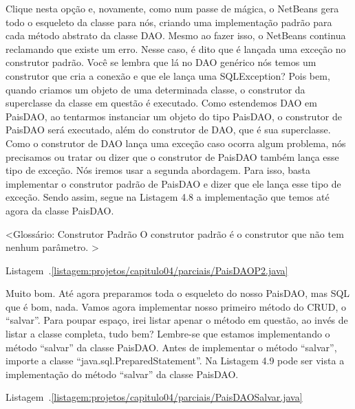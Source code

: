 Clique nesta opção e, novamente, como num passe de mágica, o NetBeans gera todo o esqueleto da classe para nós, criando uma implementação padrão para cada método abstrato da classe DAO. Mesmo ao fazer isso, o NetBeans continua reclamando que existe um erro. Nesse caso, é dito que é lançada uma exceção no construtor padrão. Você se lembra que lá no DAO genérico nós temos um construtor que cria a conexão e que ele lança uma SQLException? Pois bem, quando criamos um objeto de uma determinada classe, o construtor da superclasse da classe em questão é executado. Como estendemos DAO em PaisDAO, ao tentarmos instanciar um objeto do tipo PaisDAO, o construtor de PaisDAO será executado, além do construtor de DAO, que é sua superclasse. Como o construtor de DAO lança uma exceção caso ocorra algum problema, nós precisamos ou tratar ou dizer que o construtor de PaisDAO também lança esse tipo de exceção. Nós iremos usar a segunda abordagem. Para isso, basta implementar o construtor padrão de PaisDAO e dizer que ele lança esse tipo de exceção. Sendo assim, segue na Listagem 4.8 a implementação que temos até agora da classe PaisDAO.

<Glossário: Construtor Padrão
O construtor padrão é o construtor que não tem nenhum parâmetro.
>

Listagem~\thechapter.\ref{listagem:projetos/capitulo04/parciais/PaisDAOP2.java}

Muito bom. Até agora preparamos toda o esqueleto do nosso PaisDAO, mas SQL que é bom, nada. Vamos agora implementar nosso primeiro método do CRUD, o ``salvar''. Para poupar espaço, irei listar apenar o método em questão, ao invés de listar a classe completa, tudo bem? Lembre-se que estamos implementando o método ``salvar'' da classe PaisDAO. Antes de implementar o método ``salvar'', importe a classe ``java.sql.PreparedStatement''. Na Listagem 4.9 pode ser vista a implementação do método ``salvar'' da classe PaisDAO.

Listagem~\thechapter.\ref{listagem:projetos/capitulo04/parciais/PaisDAOSalvar.java}

